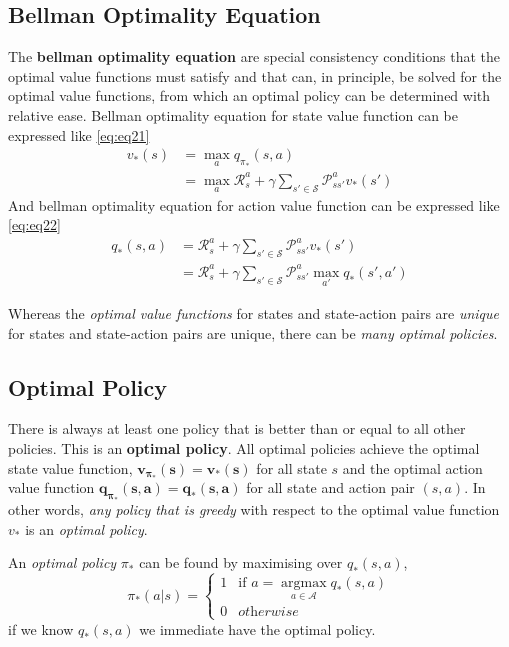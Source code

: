 \documentclass[
	10pt, %
]{article}
\theoremstyle{plain}
\newcommand{\mc}[1]{\mathcal{#1}}
\newcommand{\tb}[1]{\textbf{#1}}
\newcommand{\ti}[1]{\textit{#1}}
\numberwithin{equation}{subsection} %
\newcommand{\argmax}{\mathop{\mathrm{argmax}}\limits}
\begin{document}
\subsection{Bellman Optimality Equation}
The \tb{bellman optimality equation} are special consistency conditions that the optimal value functions must satisfy and that can, in principle, be solved for the optimal value functions, from which an optimal policy can be determined with relative ease. Bellman optimality equation for state value function can be expressed like \cref{eq:eq21}
\begin{equation} \label{eq:eq21}
    \begin{aligned}
        v_*(s) &= \max_{a}q_{\pi_*}(s,a)\\
        &=\max_a \mc{R}^a_{s} + \gamma \sum_{s' \in \mc{S}}\mc{P}^a_{ss'}v_*(s')
    \end{aligned}
\end{equation}
And bellman optimality equation for action value function can be expressed like \cref{eq:eq22}
\begin{equation} \label{eq:eq22}
    \begin{aligned}
        q_*(s,a) &= \mc{R}^a_{s} + \gamma \sum_{s' \in \mc{S}} \mc{P}^a_{ss'}v_*(s') \\
        &= \mc{R}^a_{s} + \gamma \sum_{s' \in \mc{S}} \mc{P}^a_{ss'} \max_{a'} q_*(s',a')
    \end{aligned}
\end{equation}



Whereas the \ti{optimal value functions} for states and state-action pairs are \ti{unique} for states and state-action pairs are unique, there can be \ti{many optimal policies}.

\subsection{Optimal Policy}
There is always at least one policy that is better than or equal to all other policies. This is an \tb{optimal policy}. All optimal policies achieve the optimal state value function, $\bm{v_{\pi_*}(s) = v_*(s)}$ for all state $s$ and the optimal action value function $\bm{q_{\pi_*}(s,a) = q_*(s,a)}$ for all state and action pair $(s,a)$. In other words, \ti{any policy that is greedy} with respect to the optimal value function $v_*$ is an \ti{optimal policy}.

An \ti{optimal policy} $\pi_*$ can be found by maximising over $q_*(s,a)$,
\begin{equation}
    \pi_*(a|s) = 
    \begin{cases}
        1 & \text{if } a = \argmax_{a \in \mc{A}}q_*(s,a) \\
        0 & \ti{otherwise}
    \end{cases}
\end{equation}
if we know $q_*(s,a)$ we immediate have the optimal policy.
\newpage
\end{document}
